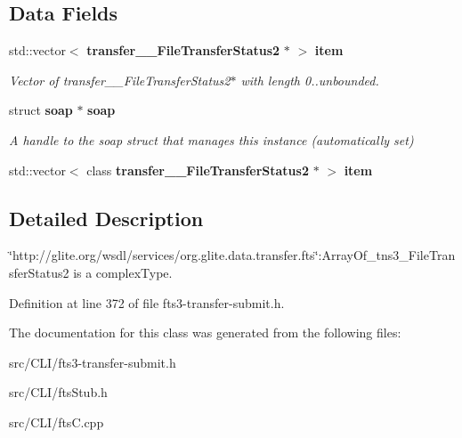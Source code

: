\subsection*{Data Fields}
\begin{DoxyCompactItemize}
\item 
std::vector$<$ {\bf transfer\_\-\_\-FileTransferStatus2} $\ast$ $>$ {\bf item}\label{classfts____ArrayOf__USCOREtns3__USCOREFileTransferStatus2_a1ad8e0133af34222fa3592c115d2b10a}

\begin{DoxyCompactList}\small\item\em Vector of transfer\_\-\_\-FileTransferStatus2$\ast$ with length 0..unbounded. \item\end{DoxyCompactList}\item 
struct {\bf soap} $\ast$ {\bf soap}\label{classfts____ArrayOf__USCOREtns3__USCOREFileTransferStatus2_adb58ce05c54bb7e444d7462439e6c328}

\begin{DoxyCompactList}\small\item\em A handle to the soap struct that manages this instance (automatically set) \item\end{DoxyCompactList}\item 
std::vector$<$ class {\bf transfer\_\-\_\-FileTransferStatus2} $\ast$ $>$ {\bfseries item}\label{classfts____ArrayOf__USCOREtns3__USCOREFileTransferStatus2_a793c9a4abdf855a936bf7f0264b5992a}

\end{DoxyCompactItemize}


\subsection{Detailed Description}
\char`\"{}http://glite.org/wsdl/services/org.glite.data.transfer.fts\char`\"{}:ArrayOf\_\-tns3\_\-FileTransferStatus2 is a complexType. 

Definition at line 372 of file fts3-\/transfer-\/submit.h.



The documentation for this class was generated from the following files:\begin{DoxyCompactItemize}
\item 
src/CLI/fts3-\/transfer-\/submit.h\item 
src/CLI/ftsStub.h\item 
src/CLI/ftsC.cpp\end{DoxyCompactItemize}
